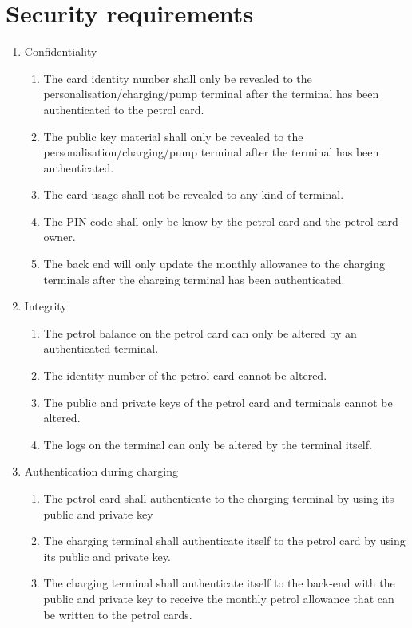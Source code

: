 
\section{Security requirements}
\begin{enumerate}
\item Confidentiality
	\begin{enumerate}
	\item The card identity number shall only be revealed to the  personalisation/charging/pump terminal after the terminal has been authenticated to the petrol card.
	\item The public key material shall only be revealed to the personalisation/charging/pump terminal after the terminal has been authenticated.
	\item The card usage shall not be revealed to any kind of terminal.
	\item The PIN code shall only be know by the petrol card and the petrol card owner. 
	\item The back end will only update the monthly allowance to the charging terminals after the charging terminal has been authenticated.
	\end{enumerate}
\item Integrity
	\begin{enumerate}
	\item The petrol balance on the petrol card can only be altered by an authenticated terminal.
	\item The identity number of the petrol card cannot be altered. 
	\item The public and private keys of the petrol card and terminals cannot be altered.
	\item The logs on the terminal can only be altered by the terminal itself. 
	\end{enumerate}

\item Authentication during charging
		\begin{enumerate}
		\item The petrol card shall authenticate to the charging terminal by using its public and private key%
		\item The charging terminal shall authenticate itself to the petrol card  by using its public and private key.
		\item The charging terminal shall authenticate itself to the back-end with the public and private key to receive the monthly petrol allowance that can be written to the petrol cards.
		\end{enumerate}	
		

\end{enumerate}
